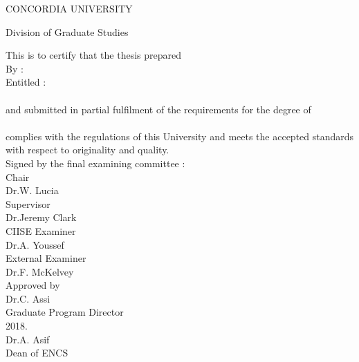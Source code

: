      \vspace*{1ex}
     \begin{center}
        CONCORDIA UNIVERSITY
     \end{center}
     \begin{center}
        Division of Graduate Studies
     \end{center}
     \vspace{3ex}
     This is to certify that the thesis prepared\\[2ex]
     By :\hspace{40pt}{\bf Seyedehmahsa Moosavi}\\[2ex]
     Entitled :\hspace*{13pt}{\bf Rethinking Certificate Authorities: \\Understanding and decentralizing domain validation}\\ 
     \hspace*{62pt}{\bf } \\[2ex]
    and submitted in partial fulfilment of the requirements for the degree
    of\\[2ex]
    \hspace*{62pt}{\bf Master of Applied Science}\\[2ex]
    complies with the regulations of this University and meets the accepted
    standards with respect to originality and quality. \\[2ex]
    Signed by the final examining committee : \\[5ex]
    \hspace*{77pt}\underline{\hspace{234pt}} Chair\\
    \hspace*{77pt}Dr.\@ W. Lucia\\[2.5ex]
     \hspace*{77pt}\underline{\hspace{234pt}} Supervisor \\
    \hspace*{77pt}Dr.\@ Jeremy Clark\\[2.5ex]
    \hspace*{77pt}\underline{\hspace{234pt}} CIISE Examiner\\
    \hspace*{77pt}Dr.\@ A. Youssef\\[2.5ex]
    \hspace*{77pt}\underline{\hspace{234pt}} External Examiner\\
    \hspace*{77pt}Dr.\@ F. McKelvey\\[2.5ex]
   
    Approved by \hspace{9pt}\underline{\hspace{232pt}}\\
    \hspace*{79pt}Dr.\@ C. Assi\\
    \hspace*{79pt}Graduate Program Director\\[6ex]
    \underline{\hspace*{110pt}} 2018. \hspace{64pt} \underline{\hspace{219pt}}\\
    \hspace*{213pt}Dr.\@ A. Asif\\
    \hspace*{213pt}Dean of ENCS